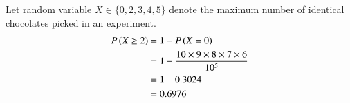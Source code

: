 
Let random variable $X\in\{0,2,3,4,5\}$ denote the maximum number of identical chocolates picked in an experiment.
\begin{align}
    P\left(X\geq2\right) &= 1-P\left(X=0\right)\\
    &=1-\frac{10\times9\times8\times7\times6}{10^{5}}\\
    &=1-0.3024\\
    &=0.6976
\end{align}
